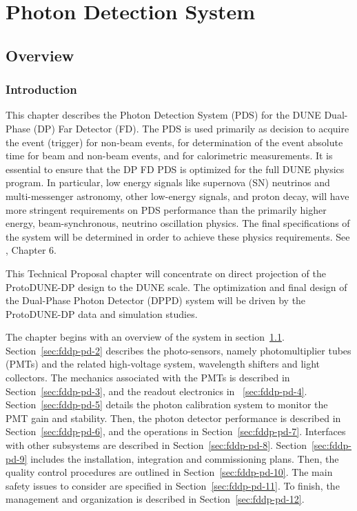\chapter{Photon Detection System}
\label{ch:fddp-pd}

\section{Overview}
\label{sec:fddp-pd-1}

\subsection{Introduction}
\label{sec:fddp-pd-1.1}

This chapter describes the Photon Detection System (PDS) for the DUNE Dual-Phase (DP) Far Detector (FD). The PDS is used primarily as decision to acquire the event (trigger) for non-beam events, for determination of the event absolute time for beam and non-beam events, and for calorimetric measurements. It is essential to ensure that the DP FD PDS is optimized for the full DUNE physics program. In particular, low energy signals like supernova (SN) neutrinos and multi-messenger astronomy, other low-energy signals, and proton decay, will have more stringent requirements on PDS performance than the primarily higher energy, beam-synchronous, neutrino oscillation physics. The final specifications of the system will be determined in order to achieve these physics requirements. See \voltitlespfd{}, Chapter 6.

This Technical Proposal chapter will concentrate on direct projection of the ProtoDUNE-DP design to the DUNE scale. The optimization and final design of the Dual-Phase Photon Detector (DPPD) system will be driven by the ProtoDUNE-DP \cite{protoDUNDP-tdr} data and simulation studies.

The chapter begins with an overview of the system in section~\ref{sec:fddp-pd-1}. Section~\ref{sec:fddp-pd-2} describes the photo-sensors, namely photomultiplier tubes (PMTs) and the related high-voltage system, wavelength shifters and light collectors. The mechanics associated with the PMTs is described in Section~\ref{sec:fddp-pd-3}, and the readout electronics in ~\ref{sec:fddp-pd-4}. Section~\ref{sec:fddp-pd-5} details the photon calibration system to monitor the PMT gain and stability. Then, the photon detector performance is described in Section~\ref{sec:fddp-pd-6}, and the operations in Section~\ref{sec:fddp-pd-7}. Interfaces with other subsystems are described in Section~\ref{sec:fddp-pd-8}. Section~\ref{sec:fddp-pd-9} includes the installation, integration and commissioning plans. Then, the quality control procedures are outlined in Section~\ref{sec:fddp-pd-10}. The main safety issues to consider are specified in Section~\ref{sec:fddp-pd-11}. To finish, the management and organization is described in Section~\ref{sec:fddp-pd-12}.

